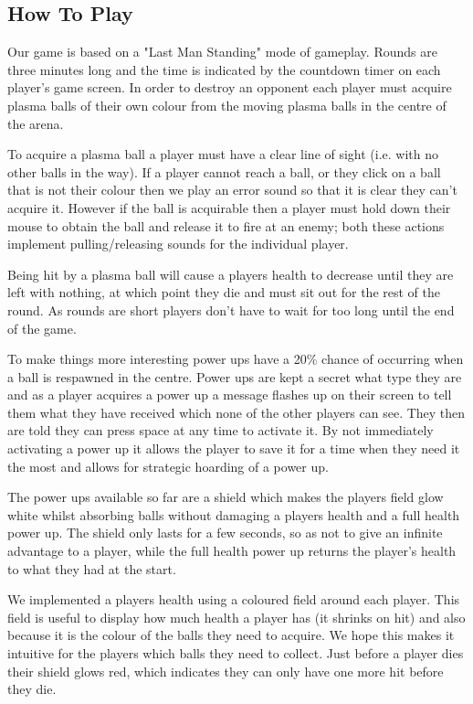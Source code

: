 \documentclass[a4wide, 11pt]{article}
\begin{document}
\subsection{How To Play}
Our game is based on a "Last Man Standing" mode of gameplay. Rounds are three minutes long and the time is indicated by the countdown timer on each player's game screen. In order to destroy an opponent each player must acquire plasma balls of their own colour from the moving plasma balls in the centre of the arena.

To acquire a plasma ball a player must have a clear line of sight (i.e. with no other balls in the way). If a player cannot reach a ball, or they click on a ball that is not their colour then we play an error sound so that it is clear they can't acquire it. However if the ball is acquirable then a player must hold down their mouse to obtain the ball and release it to fire at an enemy; both these actions implement pulling/releasing sounds for the individual player. 

Being hit by a plasma ball will cause a players health to decrease until they are left with nothing, at which point they die and must sit out for the rest of the round. As rounds are short players don't have to wait for too long until the end of the game.

To make things more interesting power ups have a 20\% chance of occurring when a ball is respawned in the centre. Power ups are kept a secret what type they are and as a player acquires a power up a message flashes up on their screen to tell them what they have received which none of the other players can see. They then are told they can press space at any time to activate it. By not immediately activating a power up it allows the player to save it for a time when they need it the most and allows for strategic hoarding of a power up.

The power ups available so far are a shield which makes the players field glow white whilst absorbing balls without damaging a players health and a full health power up. The shield only lasts for a few seconds, so as not to give an infinite advantage to a player, while the full health power up returns the player's health to what they had at the start.

We implemented a players health using a coloured field around each player. This field is useful to display how much health a player has (it shrinks on hit) and also because it is the colour of the balls they need to acquire. We hope this makes it intuitive for the players which balls they need to collect. Just before a player dies their shield glows red, which indicates they can only have one more hit before they die.
\end{document}
